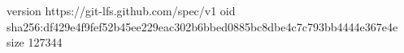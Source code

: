 version https://git-lfs.github.com/spec/v1
oid sha256:df429e4f9fef52b45ee229eac302b6bbed0885bc8dbe4c7c793bb4444e367e4e
size 127344
